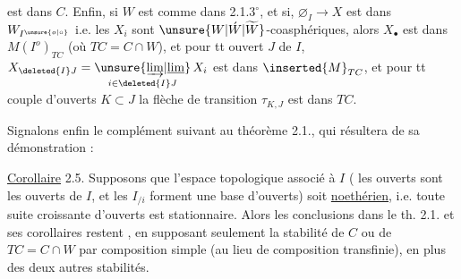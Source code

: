
est dans $C$. Enfin, si $W$ est comme dans 2.1.$3^\circ$, et si, $\varnothing_I\longrightarrow X$ est dans $W_{I^{\unsure{o|\circ}}}$ i.e. les $X_i$ sont $\unsure{W|\acute W|\widetilde W}$-coasphériques, alors \deleted{\unsure{$\varnothing$}} $X_\bullet$ est dans $M(I^o)_{TC}$ (où $TC=C\cap W$), et pour tt ouvert $J$ de $I$, $X_{\deleted{I}J}=\underset{i\in\deleted{I}J}{\unsure{\underrightarrow{\lim}|\underline{\lim}}}\,X_i$ est dans $\inserted{M}_{TC}$,  et pour tt couple d'ouverts $K\subset J$ la flèche de transition $\tau_{K,J}$ est dans $TC$.

Signalons enfin le complément suivant au théorème 2.1., qui résultera de sa démonstration :

\uline{Corollaire} 2.5. Supposons que l'espace topologique associé à $I$ ( les ouverts sont les ouverts de $I$, et les $I_{/i}$ forment une base d'ouverts) soit \uline{noethérien}, i.e. toute suite croissante d'ouverts est stationnaire. Alors  les conclusions dans le th. 2.1. et ses corollaires restent , en supposant seulement la stabilité de $C$ ou de $TC=C\cap W$ par composition simple (au lieu de composition transfinie), en plus des deux autres stabilités.


